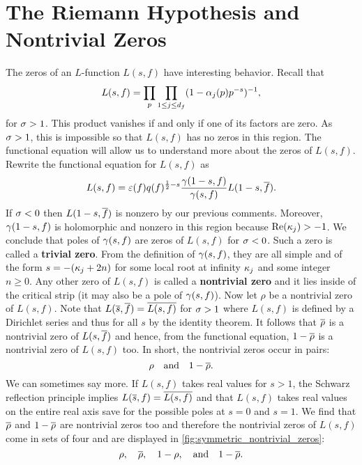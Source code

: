   \section{The Riemann Hypothesis and Nontrivial Zeros}
    The zeros of an $L$-function $L(s,f)$ have interesting behavior. Recall that
    \[
      L(s,f) = \prod_{p}\prod_{1 \le j \le d_{f}}(1-\alpha_{j}(p)p^{-s})^{-1},
    \]
    for $\sigma > 1$. This product vanishes if and only if one of its factors are zero. As $\sigma > 1$, this is impossible so that $L(s,f)$ has no zeros in this region. The functional equation will allow us to understand more about the zeros of $L(s,f)$. Rewrite the functional equation for $L(s,f)$ as
    \begin{equation}\label{equ:fun_eq_for_zeros}
      L(s,f) = \varepsilon(f)q(f)^{\frac{1}{2}-s}\frac{\gamma(1-s,f)}{\gamma(s,f)}L(1-s,\overline{f}).
    \end{equation}
    If $\sigma < 0$ then $L(1-s,\overline{f})$ is nonzero by our previous comments. Moreover, $\gamma(1-s,f)$ is holomorphic and nonzero in this region because $\mathrm{Re}(\kappa_{j}) > -1$. We conclude that poles of $\gamma(s,f)$ are zeros of $L(s,f)$ for $\sigma < 0$. Such a zero is called a \textbf{trivial zero}. From the definition of $\gamma(s,f)$, they are all simple and of the form $s = -(\kappa_{j}+2n)$ for some local root at infinity $\kappa_{j}$ and some integer $n \ge 0$. Any other zero of $L(s,f)$ is called a \textbf{nontrivial zero} and it lies inside of the critical strip (it may also be a pole of $\gamma(s,f)$). Now let $\rho$ be a nontrivial zero of $L(s,f)$. Note that $L(\overline{s},\overline{f}) = \overline{L(s,f)}$ for $\sigma > 1$ where $L(s,f)$ is defined by a Dirichlet series and thus for all $s$ by the identity theorem. It follows that $\overline{\rho}$ is a nontrivial zero of $L(s,\overline{f})$ and hence, from the functional equation, $1-\overline{\rho}$ is a nontrivial zero of $L(s,f)$ too. In short, the nontrivial zeros occur in pairs:
    \[
      \rho \quad \text{and} \quad 1-\overline{\rho}.
    \]
    We can sometimes say more. If $L(s,f)$ takes real values for $s > 1$, the Schwarz reflection principle implies $L(\overline{s},f) = \overline{L(s,f)}$ and that $L(s,f)$ takes real values on the entire real axis save for the possible poles at $s = 0$ and $ s = 1$. We find that $\overline{\rho}$ and $1-\overline{\rho}$ are nontrivial zeros too and therefore the nontrivial zeros of $L(s,f)$ come in sets of four and are displayed in \cref{fig:symmetric_nontrivial_zeros}:
    \[
      \rho, \quad \overline{\rho}, \quad 1-\rho, \quad \text{and} \quad 1-\overline{\rho}.
    \]

